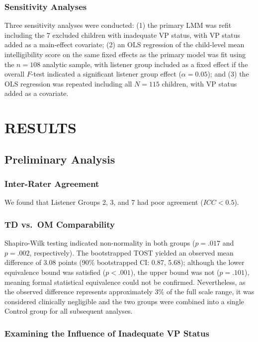 \documentclass[11pt]{article}
\begin{document}
\subsubsection*{Sensitivity Analyses}
Three sensitivity analyses were conducted: (1) the primary LMM was refit
including the 7 excluded children with inadequate VP status, with VP status
added as a main-effect covariate; (2) an OLS regression of the child-level mean intelligibility score on the same fixed effects as the primary model was fit using the $n = 108$ analytic sample, with listener group included as a fixed effect if the overall $F$-test indicated a significant listener group effect ($\alpha = 0.05$); and (3) the OLS regression was repeated including all $N = 115$
children, with VP status added as a covariate.

\section*{RESULTS}\label{sec:results}

\subsection*{Preliminary Analysis}\label{sec:res-prelim}
\subsubsection*{Inter-Rater Agreement}
We found that Listener Groups 2, 3, and 7 had poor agreement ($ICC < 0.5$).

\subsubsection*{TD vs.\ OM Comparability}
Shapiro-Wilk testing indicated non-normality in both groups ($p = .017$ and
$p = .002$, respectively). The bootstrapped TOST yielded an observed mean
difference of 3.08 points (90\% bootstrapped CI: 0.87, 5.68); although the
lower equivalence bound was satisfied ($p < .001$), the upper bound was not
($p = .101$), meaning formal statistical equivalence could not be confirmed.
Nevertheless, as the observed difference represents approximately 3\% of the
full scale range, it was considered clinically negligible and the two groups
were combined into a single Control group for all subsequent analyses.

\subsubsection*{Examining the Influence of Inadequate VP Status}
\end{document}
